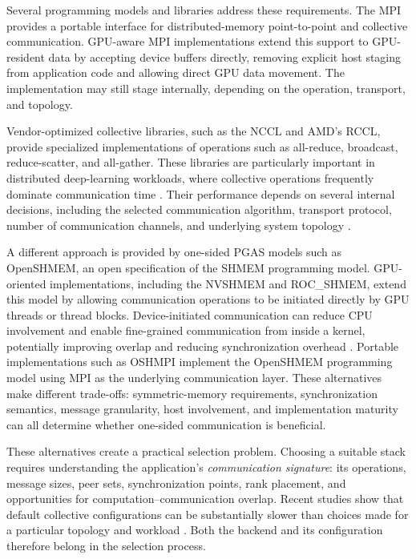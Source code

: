 Several programming models and libraries address these requirements. The \ac{MPI} provides a portable interface for distributed-memory point-to-point and collective communication. GPU-aware MPI implementations extend this support to GPU-resident data by accepting device buffers directly, removing explicit host staging from application code and allowing direct GPU data movement. The implementation may still stage internally, depending on the operation, transport, and topology.

Vendor-optimized collective libraries, such as the \ac{NCCL} and AMD's \ac{RCCL}, provide specialized implementations of operations such as all-reduce, broadcast, reduce-scatter, and all-gather. These libraries are particularly important in distributed deep-learning workloads, where collective operations frequently dominate communication time \cite{weingram_xccl_2023}. Their performance depends on several internal decisions, including the selected communication algorithm, transport protocol, number of communication channels, and underlying system topology \cite{hu_demystifying_2025}.

A different approach is provided by one-sided \ac{PGAS} models such as OpenSHMEM, an open specification of the \ac{SHMEM} programming model. GPU-oriented implementations, including the \ac{NVSHMEM} and ROC\_SHMEM, extend this model by allowing communication operations to be initiated directly by GPU threads or thread blocks. Device-initiated communication can reduce CPU involvement and enable fine-grained communication from inside a kernel, potentially improving overlap and reducing synchronization overhead \cite{agostini_gpudirect_2018,ma_demystifying_2026}. Portable implementations such as \ac{OSHMPI} implement the OpenSHMEM programming model using MPI as the underlying communication layer. These alternatives make different trade-offs: symmetric-memory requirements, synchronization semantics, message granularity, host involvement, and implementation maturity can all determine whether one-sided communication is beneficial.

These alternatives create a practical selection problem. Choosing a suitable stack requires understanding the application's \emph{communication signature}: its operations, message sizes, peer sets, synchronization points, rank placement, and opportunities for computation--communication overlap. Recent studies show that default collective configurations can be substantially slower than choices made for a particular topology and workload \cite{pasqualoni_pico_2026,li_tuccl_2025}. Both the backend and its configuration therefore belong in the selection process.

